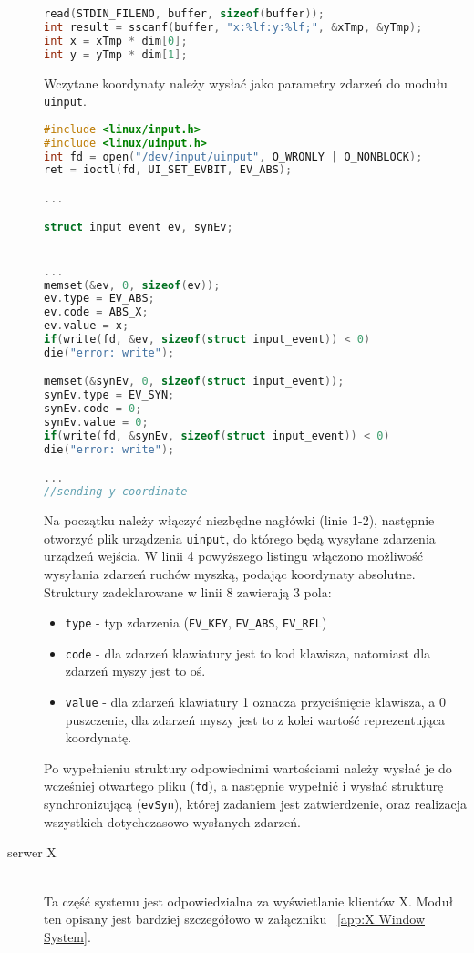 \begin{description}
\begin{lstlisting}[language=c]
read(STDIN_FILENO, buffer, sizeof(buffer));
int result = sscanf(buffer, "x:%lf:y:%lf;", &xTmp, &yTmp);
int x = xTmp * dim[0];
int y = yTmp * dim[1];
\end{lstlisting}

Wczytane koordynaty należy wysłać jako parametry zdarzeń do modułu \lstinline{uinput}. 

\begin{lstlisting}[language=c]
#include <linux/input.h>
#include <linux/uinput.h>
int fd = open("/dev/input/uinput", O_WRONLY | O_NONBLOCK);
ret = ioctl(fd, UI_SET_EVBIT, EV_ABS);

...

struct input_event ev, synEv;


...
memset(&ev, 0, sizeof(ev));
ev.type = EV_ABS;
ev.code = ABS_X;
ev.value = x;
if(write(fd, &ev, sizeof(struct input_event)) < 0)
die("error: write");  

memset(&synEv, 0, sizeof(struct input_event));
synEv.type = EV_SYN;
synEv.code = 0;
synEv.value = 0;
if(write(fd, &synEv, sizeof(struct input_event)) < 0)
die("error: write");

...
//sending y coordinate


\end{lstlisting}
		Na początku należy włączyć niezbędne nagłówki (linie 1-2), następnie otworzyć plik urządzenia \lstinline{uinput}, do którego będą wysyłane zdarzenia urządzeń wejścia. W linii 4 powyższego listingu włączono możliwość wysyłania zdarzeń ruchów myszką, podając koordynaty absolutne. Struktury zadeklarowane w linii 8 zawierają 3 pola: 
\begin{itemize}
\item \lstinline{type} - typ zdarzenia (\lstinline{EV_KEY}, \lstinline{EV_ABS}, \lstinline{EV_REL})		
\item \lstinline{code} - dla zdarzeń klawiatury jest to kod klawisza, natomiast dla zdarzeń myszy jest to oś.
\item \lstinline{value} - dla zdarzeń klawiatury 1 oznacza przyciśnięcie klawisza, a 0 puszczenie, dla zdarzeń myszy jest to z kolei wartość reprezentująca koordynatę.
\end{itemize}
		Po wypełnieniu struktury odpowiednimi wartościami należy wysłać je do wcześniej otwartego pliku (\lstinline{fd}), a następnie wypełnić i wysłać strukturę synchronizującą (\lstinline{evSyn}), której zadaniem jest zatwierdzenie, oraz realizacja wszystkich dotychczasowo wysłanych zdarzeń. 
	\item[serwer X] \hfill \\
	Ta część systemu jest odpowiedzialna za wyświetlanie klientów X.
		Moduł ten opisany jest bardziej szczegółowo w załączniku ~\ref{app:X Window System}.


\end{description}

